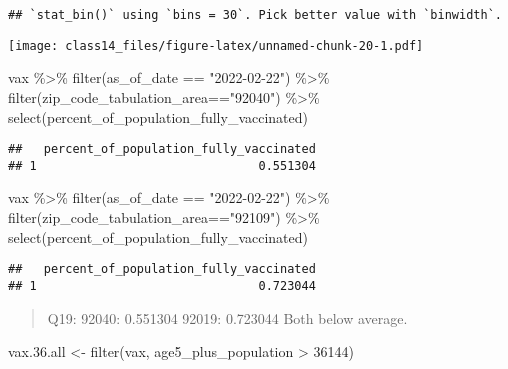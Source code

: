 \documentclass[
]{article}
\newenvironment{Shaded}{\begin{snugshade}}{\end{snugshade}}
\newcommand{\DecValTok}[1]{\textcolor[rgb]{0.00,0.00,0.81}{#1}}
\newcommand{\FloatTok}[1]{\textcolor[rgb]{0.00,0.00,0.81}{#1}}
\newcommand{\FunctionTok}[1]{\textcolor[rgb]{0.00,0.00,0.00}{#1}}
\newcommand{\NormalTok}[1]{#1}
\newcommand{\OtherTok}[1]{\textcolor[rgb]{0.56,0.35,0.01}{#1}}
\newcommand{\SpecialCharTok}[1]{\textcolor[rgb]{0.00,0.00,0.00}{#1}}
\newcommand{\StringTok}[1]{\textcolor[rgb]{0.31,0.60,0.02}{#1}}
\begin{document}
\begin{verbatim}
## `stat_bin()` using `bins = 30`. Pick better value with `binwidth`.
\end{verbatim}

\texttt{[image: class14\_files/figure-latex/unnamed-chunk-20-1.pdf]}

\begin{Shaded}
\begin{Highlighting}[]
\NormalTok{vax }\SpecialCharTok{\%\textgreater{}\%} \FunctionTok{filter}\NormalTok{(as\_of\_date }\SpecialCharTok{==} \StringTok{"2022{-}02{-}22"}\NormalTok{) }\SpecialCharTok{\%\textgreater{}\%}  
  \FunctionTok{filter}\NormalTok{(zip\_code\_tabulation\_area}\SpecialCharTok{==}\StringTok{"92040"}\NormalTok{) }\SpecialCharTok{\%\textgreater{}\%}
  \FunctionTok{select}\NormalTok{(percent\_of\_population\_fully\_vaccinated)}
\end{Highlighting}
\end{Shaded}

\begin{verbatim}
##   percent_of_population_fully_vaccinated
## 1                               0.551304
\end{verbatim}

\begin{Shaded}
\begin{Highlighting}[]
\NormalTok{vax }\SpecialCharTok{\%\textgreater{}\%} \FunctionTok{filter}\NormalTok{(as\_of\_date }\SpecialCharTok{==} \StringTok{"2022{-}02{-}22"}\NormalTok{) }\SpecialCharTok{\%\textgreater{}\%}  
  \FunctionTok{filter}\NormalTok{(zip\_code\_tabulation\_area}\SpecialCharTok{==}\StringTok{"92109"}\NormalTok{) }\SpecialCharTok{\%\textgreater{}\%}
  \FunctionTok{select}\NormalTok{(percent\_of\_population\_fully\_vaccinated)}
\end{Highlighting}
\end{Shaded}

\begin{verbatim}
##   percent_of_population_fully_vaccinated
## 1                               0.723044
\end{verbatim}

\begin{quote}
Q19: 92040: 0.551304 92019: 0.723044 Both below average.
\end{quote}

\begin{Shaded}
\begin{Highlighting}[]
\NormalTok{vax.}\FloatTok{36.}\NormalTok{all }\OtherTok{\textless{}{-}} \FunctionTok{filter}\NormalTok{(vax, age5\_plus\_population }\SpecialCharTok{\textgreater{}} \DecValTok{36144}\NormalTok{)}
\end{Highlighting}
\end{Shaded}
\end{document}
